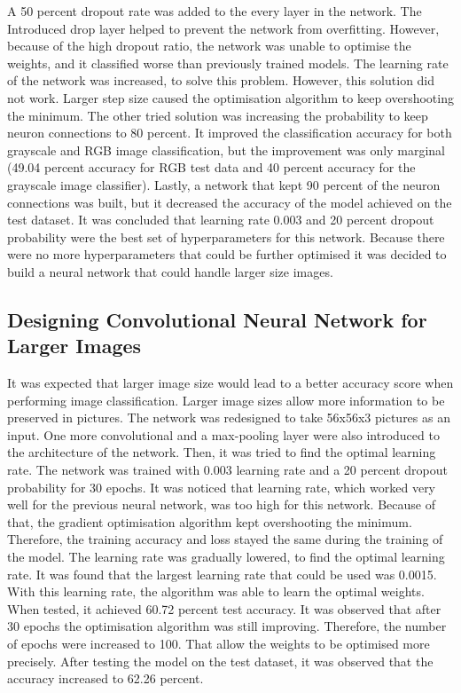 A 50 percent dropout rate was added to the every layer in the network. The Introduced drop layer helped to prevent the network from overfitting. However, because of the high dropout ratio, the network was unable to optimise the weights, and it classified worse than previously trained models. The learning rate of the network was increased, to solve this problem. However, this solution did not work. Larger step size caused the optimisation algorithm to keep overshooting the minimum. The other tried solution was increasing the probability to keep neuron connections to 80 percent. It improved the classification accuracy for both grayscale and RGB image classification, but the improvement was only marginal (49.04 percent accuracy for RGB test data and 40 percent accuracy for the grayscale image classifier). Lastly, a network that kept 90 percent of the neuron connections was built, but it decreased the accuracy of the model achieved on the test dataset. It was concluded that learning rate 0.003 and 20 percent dropout probability were the best set of hyperparameters for this network. Because there were no more hyperparameters that could be further optimised it was decided to build a neural network that could handle larger size images.


\subsection{Designing Convolutional Neural Network  for Larger Images}

It was expected that larger image size would lead to a better accuracy score when performing image classification. Larger image sizes allow more information to be preserved in pictures. The network was redesigned to take 56x56x3 pictures as an input. One more convolutional and a max-pooling layer were also introduced to the architecture of the network. Then, it was tried to find the optimal learning rate. The network was trained with 0.003 learning rate and a 20 percent dropout probability for 30 epochs. It was noticed that learning rate, which worked very well for the previous neural network, was too high for this network. Because of that, the gradient optimisation algorithm kept overshooting the minimum. Therefore, the training accuracy and loss stayed the same during the training of the model. The learning rate was gradually lowered, to find the optimal learning rate.  It was found that the largest learning rate that could be used was 0.0015. With this learning rate, the algorithm was able to learn the optimal weights. When tested, it achieved 60.72 percent test accuracy. It was observed that after 30 epochs the optimisation algorithm was still improving. Therefore,  the number of epochs were increased to 100.  That allow the weights to be optimised more precisely. After testing the model on the test dataset, it was observed that the accuracy increased to 62.26 percent.

